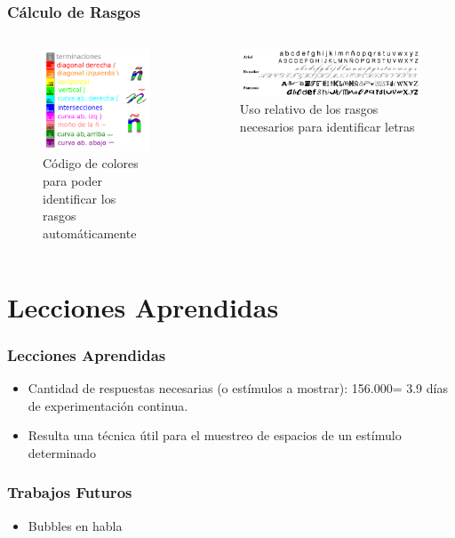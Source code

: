 \documentclass{beamer}
\begin{document}
\begin{frame}
 \frametitle{Cálculo de Rasgos}
\begin{columns} [t]
\begin{figure}
 \includegraphics[width=.8\textwidth]{graficos/REFERENCIA.png}
\caption{Código de colores para poder identificar los rasgos automáticamente}
\end{figure}
\begin{figure}
 \includegraphics[width=.5\textwidth]{graficos/letras.png}
\caption{Uso relativo de los rasgos necesarios para identificar letras}
\end{figure}
\end{columns}
\end{frame}



\section{Lecciones Aprendidas}
\begin{frame}
 \frametitle{Lecciones Aprendidas}
\begin{itemize}
\item Cantidad de respuestas necesarias (o estímulos a mostrar): 156.000= 3.9 días de experimentación continua.
\item Resulta una técnica útil para el muestreo de espacios de un estímulo determinado
\end{itemize}
\end{frame}

\begin{frame}
 \frametitle{Trabajos Futuros}
\begin{itemize}
 \item Bubbles en habla
\end{itemize}
\end{frame}
\end{document}
